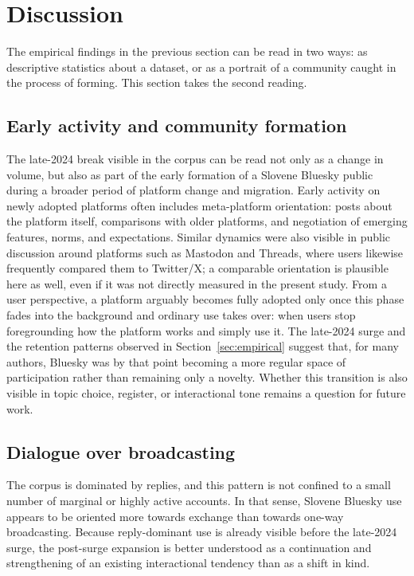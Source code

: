 \section{Discussion}

The empirical findings in the previous section can be read in two ways: as descriptive statistics about a dataset, or as a portrait of a community caught in the process of forming. This section takes the second reading.

\subsection{Early activity and community formation}

The late-2024 break visible in the corpus can be read not only as a change in volume, but also as part of the early formation of a Slovene Bluesky public during a broader period of platform change and migration. Early activity on newly adopted platforms often includes meta-platform orientation: posts about the platform itself, comparisons with older platforms, and negotiation of emerging features, norms, and expectations. Similar dynamics were also visible in public discussion around platforms such as Mastodon and Threads, where users likewise frequently compared them to Twitter/X; a comparable orientation is plausible here as well, even if it was not directly measured in the present study. From a user perspective, a platform arguably becomes fully adopted only once this phase fades into the background and ordinary use takes over: when users stop foregrounding how the platform works and simply use it. The late-2024 surge and the retention patterns observed in Section~\ref{sec:empirical} suggest that, for many authors, Bluesky was by that point becoming a more regular space of participation rather than remaining only a novelty. Whether this transition is also visible in topic choice, register, or interactional tone remains a question for future work.

\subsection{Dialogue over broadcasting}

The corpus is dominated by replies, and this pattern is not confined to a small number of marginal or highly active accounts. In that sense, Slovene Bluesky use appears to be oriented more towards exchange than towards one-way broadcasting. Because reply-dominant use is already visible before the late-2024 surge, the post-surge expansion is better understood as a continuation and strengthening of an existing interactional tendency than as a shift in kind.

